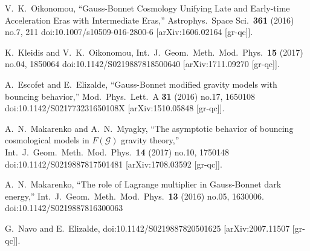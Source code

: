 \documentclass[aps,prd,twocolumn,groupedaddress,showpacs,nofootinbib,amssymb]{revtex4-2}
\begin{document}
\begin{thebibliography}{99}
  V.~K.~Oikonomou,
``Gauss-Bonnet Cosmology Unifying Late and Early-time Acceleration
Eras with Intermediate Eras,''
  Astrophys.\ Space Sci.\  {\bf 361} (2016) no.7,  211
  doi:10.1007/s10509-016-2800-6
  [arXiv:1606.02164 [gr-qc]].

  K.~Kleidis and V.~K.~Oikonomou,
  Int.\ J.\ Geom.\ Meth.\ Mod.\ Phys.\  {\bf 15} (2017) no.04,  1850064
  doi:10.1142/S0219887818500640
  [arXiv:1711.09270 [gr-qc]].





  A.~Escofet and E.~Elizalde,
``Gauss-Bonnet modified gravity models with bouncing behavior,''
  Mod.\ Phys.\ Lett.\ A {\bf 31} (2016) no.17,  1650108
  doi:10.1142/S021773231650108X
  [arXiv:1510.05848 [gr-qc]].



  A.~N.~Makarenko and A.~N.~Myagky,
``The asymptotic behavior of bouncing cosmological models in
$F(\mathcal{G})$ gravity theory,''
  Int.\ J.\ Geom.\ Meth.\ Mod.\ Phys.\  {\bf 14} (2017) no.10,  1750148
  doi:10.1142/S0219887817501481
  [arXiv:1708.03592 [gr-qc]].







  A.~N.~Makarenko,
``The role of Lagrange multiplier in Gauss-Bonnet dark energy,''
  Int.\ J.\ Geom.\ Meth.\ Mod.\ Phys.\  {\bf 13} (2016) no.05,  1630006.
  doi:10.1142/S0219887816300063

G.~Navo and E.~Elizalde,
doi:10.1142/S0219887820501625 [arXiv:2007.11507 [gr-qc]].



\end{thebibliography}
\end{document}
